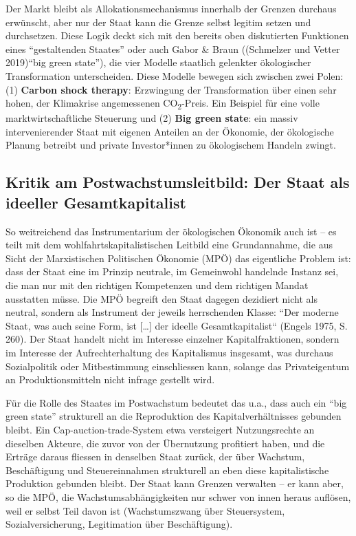 \documentclass[
  nswissgerman,
  a4paper,
  DIV=11,
  numbers=noendperiod,
  oneside,
  openany]{scrreprt}
\begin{document}
Der Markt bleibt als Allokationsmechanismus innerhalb der Grenzen
durchaus erwünscht, aber nur der Staat kann die Grenze selbst legitim
setzen und durchsetzen. Diese Logik deckt sich mit den bereits oben
diskutierten Funktionen eines ``gestaltenden Staates'' oder auch Gabor
\& Braun ((Schmelzer und Vetter 2019)``big green state''), die vier
Modelle staatlich gelenkter ökologischer Transformation unterscheiden.
Diese Modelle bewegen sich zwischen zwei Polen: (1) \textbf{Carbon shock
therapy}: Erzwingung der Transformation über einen sehr hohen, der
Klimakrise angemessenen CO\textsubscript{2}-Preis. Ein Beispiel für eine
volle marktwirtschaftliche Steuerung und (2) \textbf{Big green state}:
ein massiv intervenierender Staat mit eigenen Anteilen an der Ökonomie,
der ökologische Planung betreibt und private Investor*innen zu
ökologischem Handeln zwingt.

\subsection{Kritik am Postwachstumsleitbild: Der Staat als ideeller
Gesamtkapitalist}\label{kritik-am-postwachstumsleitbild-der-staat-als-ideeller-gesamtkapitalist}

So weitreichend das Instrumentarium der ökologischen Ökonomik auch ist
-- es teilt mit dem wohlfahrtskapitalistischen Leitbild eine
Grundannahme, die aus Sicht der Marxistischen Politischen Ökonomie (MPÖ)
das eigentliche Problem ist: dass der Staat eine im Prinzip neutrale, im
Gemeinwohl handelnde Instanz sei, die man nur mit den richtigen
Kompetenzen und dem richtigen Mandat ausstatten müsse. Die MPÖ begreift
den Staat dagegen dezidiert nicht als neutral, sondern als Instrument
der jeweils herrschenden Klasse: ``Der moderne Staat, was auch seine
Form, ist {[}\ldots{]} der ideelle Gesamtkapitalist`` (Engels 1975, S.
260). Der Staat handelt nicht im Interesse einzelner Kapitalfraktionen,
sondern im Interesse der Aufrechterhaltung des Kapitalismus insgesamt,
was durchaus Sozialpolitik oder Mitbestimmung einschliessen kann,
solange das Privateigentum an Produktionsmitteln nicht infrage gestellt
wird.

Für die Rolle des Staates im Postwachstum bedeutet das u.a., dass auch
ein ``big green state'' strukturell an die Reproduktion des
Kapitalverhältnisses gebunden bleibt. Ein Cap-auction-trade-System etwa
versteigert Nutzungsrechte an dieselben Akteure, die zuvor von der
Übernutzung profitiert haben, und die Erträge daraus fliessen in
denselben Staat zurück, der über Wachstum, Beschäftigung und
Steuereinnahmen strukturell an eben diese kapitalistische Produktion
gebunden bleibt. Der Staat kann Grenzen verwalten -- er kann aber, so
die MPÖ, die Wachstumsabhängigkeiten nur schwer von innen heraus
auflösen, weil er selbst Teil davon ist (Wachstumszwang über
Steuersystem, Sozialversicherung, Legitimation über Beschäftigung).
\end{document}
